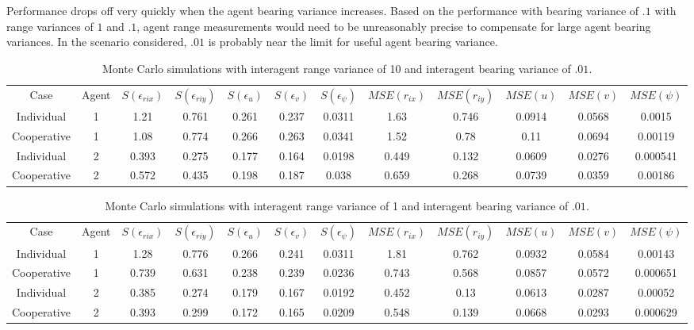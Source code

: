 \documentclass{aiaa-tc}
\begin{document}
Performance drops off very quickly when the agent bearing variance increases. Based on the performance with bearing variance of $.1$ with range variances of $1$ and $.1$, agent range measurements would need to be unreasonably precise to compensate for large agent bearing variances. In the scenario considered, $.01$ is probably near the limit for useful agent bearing variance.

\begin{table}[tb!]
\scriptsize
\centering
\begin{tabular}{c|c|c|c|c|c|c|c|c|c|c|c|}
Case & Agent & $S(\epsilon_{rix})$ & $S(\epsilon_{riy})$ & $S(\epsilon_{u})$ & $S(\epsilon_{v})$ & $S(\epsilon_{\psi})$ & $MSE(r_{ix})$ & $MSE(r_{iy})$ & $MSE(u)$ & $MSE(v)$ & $MSE(\psi)$ \\
Individual & 1& 1.21& 0.761& 0.261& 0.237& 0.0311& 1.63& 0.746& 0.0914& 0.0568& 0.0015 \\
Cooperative & 1& 1.08& 0.774& 0.266& 0.263& 0.0341& 1.52& 0.78& 0.11& 0.0694& 0.00119 \\
Individual & 2& 0.393& 0.275& 0.177& 0.164& 0.0198& 0.449& 0.132& 0.0609& 0.0276& 0.000541 \\
Cooperative & 2& 0.572& 0.435& 0.198& 0.187& 0.038& 0.659& 0.268& 0.0739& 0.0359& 0.00186 \\
\end{tabular}
\caption{Monte Carlo simulations with interagent range variance of 10 and interagent bearing variance of $.01$.}
\label{tab:sig_ar10}
\end{table}

\begin{table}[tb!]
\scriptsize
\centering
\begin{tabular}{c|c|c|c|c|c|c|c|c|c|c|c|}
Case & Agent & $S(\epsilon_{rix})$ & $S(\epsilon_{riy})$ & $S(\epsilon_{u})$ & $S(\epsilon_{v})$ & $S(\epsilon_{\psi})$ & $MSE(r_{ix})$ & $MSE(r_{iy})$ & $MSE(u)$ & $MSE(v)$ & $MSE(\psi)$ \\
Individual & 1& 1.28& 0.776& 0.266& 0.241& 0.0311& 1.81& 0.762& 0.0932& 0.0584& 0.00143 \\
Cooperative & 1& 0.739& 0.631& 0.238& 0.239& 0.0236& 0.743& 0.568& 0.0857& 0.0572& 0.000651 \\
Individual & 2& 0.385& 0.274& 0.179& 0.167& 0.0192& 0.452& 0.13& 0.0613& 0.0287& 0.00052 \\
Cooperative & 2& 0.393& 0.299& 0.172& 0.165& 0.0209& 0.548& 0.139& 0.0668& 0.0293& 0.000629 \\
\end{tabular}
\caption{Monte Carlo simulations with interagent range variance of 1 and interagent bearing variance of $.01$.}
\label{tab:sig_ar1}
\end{table}
\end{document}
